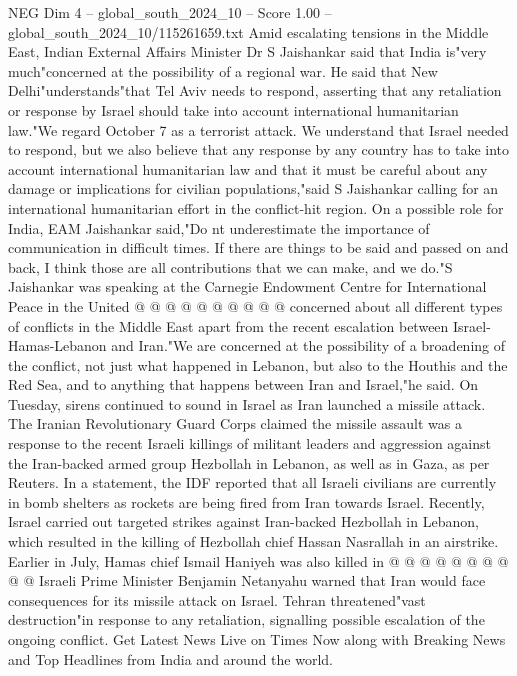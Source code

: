 \begin{textsample}{NEG Dim 4 – global\_south\_2024\_10 – Score 1.00 – global\_south\_2024\_10/115261659.txt}  \label{ex:f4_neg_078}
Amid escalating tensions in the Middle East, Indian External Affairs Minister Dr S Jaishankar said that India is"very much"concerned at the possibility of a regional war.
He said that New Delhi"understands"that Tel Aviv needs to respond, asserting that any retaliation or response by Israel should take into account international humanitarian law."We regard October 7 as a terrorist attack.
We understand that Israel needed to respond, but we also believe that any response by any country has to take into account international humanitarian law and that it must be careful about any damage or implications for civilian populations,"said S Jaishankar calling for an international humanitarian effort in the conflict-hit region.
On a possible role for India, EAM Jaishankar said,"Do nt underestimate the importance of communication in difficult times.
If there are things to be said and passed on and back, I think those are all contributions that we can make, and we do."S Jaishankar was speaking at the Carnegie Endowment Centre for International Peace in the United @ @ @ @ @ @ @ @ @ @ concerned about all different types of conflicts in the Middle East apart from the recent escalation between Israel-Hamas-Lebanon and Iran."We are concerned at the possibility of a broadening of the conflict, not just what happened in Lebanon, but also to the Houthis and the Red Sea, and to anything that happens between Iran and Israel,"he said.
On Tuesday, sirens continued to sound in Israel as Iran launched a missile attack.
The Iranian Revolutionary Guard Corps claimed the missile assault was a response to the recent Israeli killings of militant leaders and aggression against the Iran-backed armed group Hezbollah in Lebanon, as well as in Gaza, as per Reuters.
In a statement, the IDF reported that all Israeli civilians are currently in bomb shelters as rockets are being fired from Iran towards Israel.
Recently, Israel carried out targeted strikes against Iran-backed Hezbollah in Lebanon, which resulted in the killing of Hezbollah chief Hassan Nasrallah in an airstrike.
Earlier in July, Hamas chief Ismail Haniyeh was also killed in @ @ @ @ @ @ @ @ @ @ Israeli Prime Minister Benjamin Netanyahu warned that Iran would face consequences for its missile attack on Israel.
Tehran threatened"vast destruction"in response to any retaliation, signalling possible escalation of the ongoing conflict.
Get Latest News Live on Times Now along with Breaking News and Top Headlines from India and around the world.

\end{textsample}
